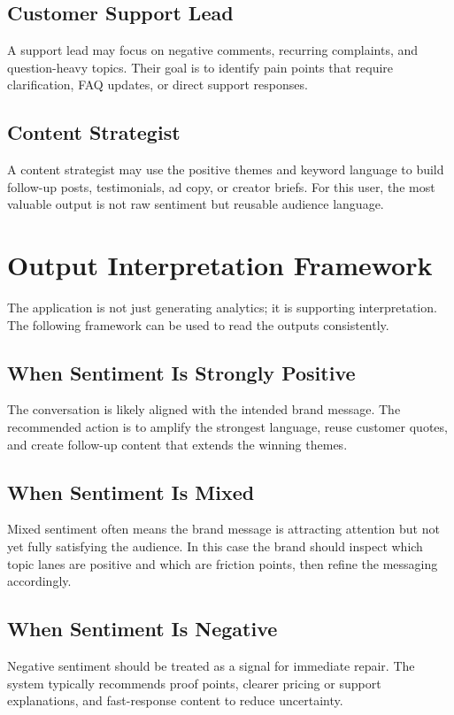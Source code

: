 \subsection{Customer Support Lead}
A support lead may focus on negative comments, recurring complaints, and question-heavy topics. Their goal is to identify pain points that require clarification, FAQ updates, or direct support responses.

\subsection{Content Strategist}
A content strategist may use the positive themes and keyword language to build follow-up posts, testimonials, ad copy, or creator briefs. For this user, the most valuable output is not raw sentiment but reusable audience language.

\section{Output Interpretation Framework}
The application is not just generating analytics; it is supporting interpretation. The following framework can be used to read the outputs consistently.

\subsection{When Sentiment Is Strongly Positive}
The conversation is likely aligned with the intended brand message. The recommended action is to amplify the strongest language, reuse customer quotes, and create follow-up content that extends the winning themes.

\subsection{When Sentiment Is Mixed}
Mixed sentiment often means the brand message is attracting attention but not yet fully satisfying the audience. In this case the brand should inspect which topic lanes are positive and which are friction points, then refine the messaging accordingly.

\subsection{When Sentiment Is Negative}
Negative sentiment should be treated as a signal for immediate repair. The system typically recommends proof points, clearer pricing or support explanations, and fast-response content to reduce uncertainty.


